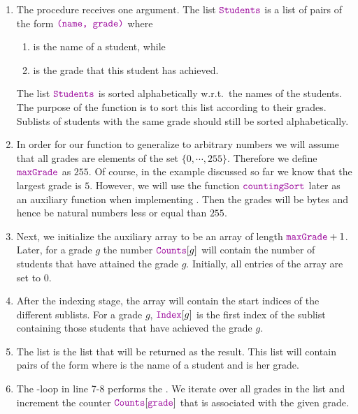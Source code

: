 \begin{enumerate}
\item The procedure  receives one argument.  The list $\mytt{Students}$
      is a list of pairs of the form $\mytt{(name, grade)}$ where
      \begin{enumerate}
      \item {}  is the name of a student, while
      \item {} is the grade that this student has achieved.
      \end{enumerate}
      The list $\mytt{Students}$ is sorted alphabetically w.r.t.~the names of the students.
      The purpose of the function  is to sort this list according to their grades.
      Sublists of students with the same grade should still be sorted alphabetically.
\item In order for our function to generalize to arbitrary numbers we will assume that all grades are elements
      of the set $\{0,\cdots,255\}$.  Therefore we define $\mytt{maxGrade}$ as $255$.
      Of course, in the example discussed so far we know that the largest
      grade is $5$.  However, we will use the function $\mytt{countingSort}$ later as an auxiliary function
      when implementing .  Then the grades will be bytes and hence be natural numbers less
      or equal than $255$.
\item Next, we initialize the auxiliary array  to be an array of length $\mytt{maxGrade}+1$.
      Later, for a grade $g$ the number $\mytt{Counts}[g]$ will contain the number of students that have
      attained the grade $g$.  Initially, all entries of the array  are set to $0$.
\item After the indexing stage, the array  will contain the start indices of the different sublists.
      For a grade $g$, $\mytt{Index}[g]$ is the first index of the sublist containing those students that
      have achieved the grade $g$.
\item The list  is the list that will be returned as the result.
      This list will contain pairs of the form  where  is the name of a student
      and  is her grade.
\item The -loop in line 7-8 performs the .  We iterate over all grades
      in the list  and increment the counter $\mytt{Counts}[\mytt{grade}]$ that is associated with the given grade.

\end{enumerate}
